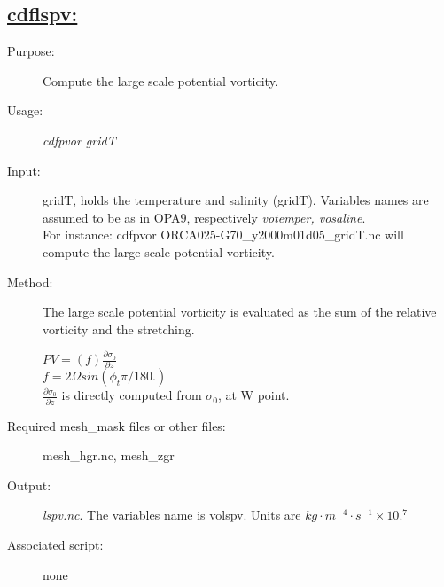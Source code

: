 \documentclass[a4paper,11pt]{article}
\begin{document}
\subsection*{\underline{cdflspv:}}
\begin{description}
\item[Purpose:] Compute the large scale potential vorticity.
\item[Usage:] {\em cdfpvor gridT  }\\
\item[Input:] gridT,  holds the temperature and salinity (gridT). Variables names are assumed to
be as in OPA9, respectively {\em votemper, vosaline}.\\
For instance: cdfpvor ORCA025-G70\_y2000m01d05\_gridT.nc 
will compute  the large scale potential vorticity. \\
\item[Method:] The large scale  potential vorticity is evaluated as the sum of the relative vorticity and the stretching.

$   PV = (f)\frac{\partial\sigma_0}{\partial z} $ \\

$   f  = 2 \Omega sin ( \phi_t  \pi / 180. ) $ \\

$ \frac{\partial\sigma_0}{\partial z} $ is directly computed from $ \sigma_0 $, at W point.

\item[Required mesh\_mask files or other files:] mesh\_hgr.nc, mesh\_zgr
\item[Output:] {\em lspv.nc}. The variables name is volspv. Units are $kg\cdot m^{-4}\cdot s^{-1}\times10.^{7}$
\item[Associated script:] none
\end{description}


\newpage
\end{document}
